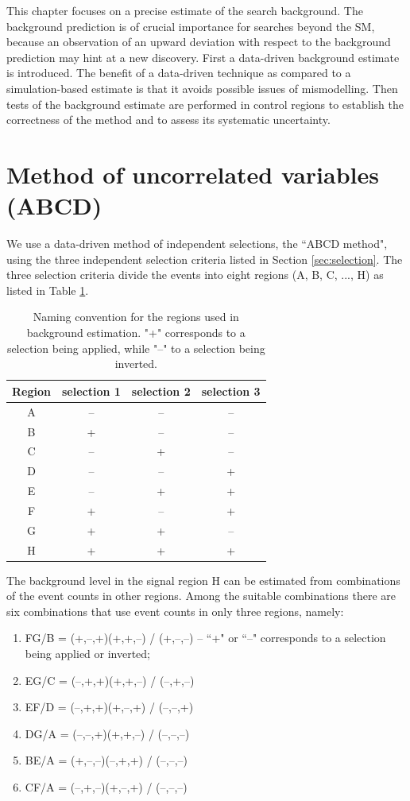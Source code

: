 This chapter focuses on a precise estimate of the search background. The
background prediction is of crucial importance for searches beyond the SM, because an observation
of an upward deviation with respect to the background prediction may hint at a new discovery.
First a data-driven background estimate is introduced. The benefit of a data-driven technique
as compared to a simulation-based estimate is that it avoids possible issues of 
mismodelling. Then tests of the background estimate are performed 
in control regions to establish the correctness of the method and to assess
its systematic uncertainty.


\section{Method of uncorrelated variables (ABCD)}
\label{sec:abcd}
We use a data-driven method of independent selections, the ``ABCD method", using
 the three independent selection criteria listed in Section \ref{sec:selection}. 
The three selection criteria divide the events into eight
regions (A, B, C, ..., H) as listed in Table \ref{tab:regions}.

\begin{table}[htbp]
\centering
\caption{Naming convention for the regions used in background estimation. "+" corresponds to a selection 
being applied, while "--" to a selection being inverted. \label{tab:regions}}
\begin{tabular}{cccc}
 \hline
  Region & selection 1 & selection 2 & selection 3 \\
 \hline
 A & -- & -- & -- \\
 B & + & -- & -- \\
 C & -- & + & -- \\
 D & -- & -- & + \\
 E & -- & + & + \\
 F & + & -- & + \\
 G & + & + & -- \\
 H & + & + & + \\
\hline
\end{tabular} 
\end{table}

The background level in the signal region H can be estimated from combinations
of the event counts in other regions. Among the suitable combinations 
there are six combinations that use event counts in only
three regions, namely:
\begin{enumerate}
 \item FG/B = (+,--,+)(+,+,--) / (+,--,--) -- ``+" or ``--" corresponds to a selection
 being applied or inverted;
 \item EG/C = (--,+,+)(+,+,--) / (--,+,--)
 \item EF/D = (--,+,+)(+,--,+) / (--,--,+)
 \item DG/A = (--,--,+)(+,+,--) / (--,--,--)
 \item BE/A = (+,--,--)(--,+,+) / (--,--,--)
 \item CF/A = (--,+,--)(+,--,+) / (--,--,--)
\end{enumerate}


